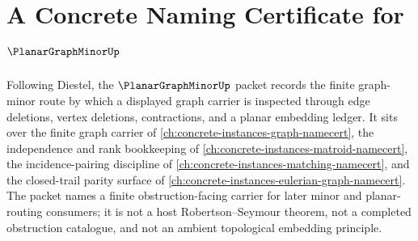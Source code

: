 \chapter{A Concrete Naming Certificate for $\PlanarGraphMinorUp$}
\label{ch:concrete-instances-planar-graph-minor-namecert}

Following Diestel, the $\PlanarGraphMinorUp$ packet records the finite graph-minor route by which a displayed graph carrier is inspected through edge deletions, vertex deletions, contractions, and a planar embedding ledger. It sits over the finite graph carrier of \autoref{ch:concrete-instances-graph-namecert}, the independence and rank bookkeeping of \autoref{ch:concrete-instances-matroid-namecert}, the incidence-pairing discipline of \autoref{ch:concrete-instances-matching-namecert}, and the closed-trail parity surface of \autoref{ch:concrete-instances-eulerian-graph-namecert}. The packet names a finite obstruction-facing carrier for later minor and planar-routing consumers; it is not a host Robertson--Seymour theorem, not a completed obstruction catalogue, and not an ambient topological embedding principle.

